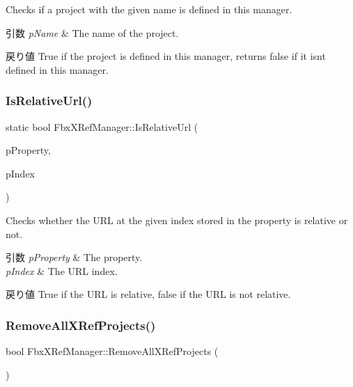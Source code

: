 Checks if a project with the given name is defined in this manager. 
\begin{DoxyParams}{引数}
{\em p\+Name} & The name of the project. \\
\hline
\end{DoxyParams}
\begin{DoxyReturn}{戻り値}
{\ttfamily True} if the project is defined in this manager, returns {\ttfamily false} if it isn\textquotesingle{}t defined in this manager. 
\end{DoxyReturn}
\mbox{\label{class_fbx_x_ref_manager_a27481156423d70e759c131954e3ea9a0}} 
\subsubsection{\texorpdfstring{Is\+Relative\+Url()}{IsRelativeUrl()}}
{\footnotesize\ttfamily static bool Fbx\+X\+Ref\+Manager\+::\+Is\+Relative\+Url (\begin{DoxyParamCaption}\item[{\hyperlink{class_fbx_property}{Fbx\+Property} const \&}]{p\+Property,  }\item[{int}]{p\+Index }\end{DoxyParamCaption})\hspace{0.3cm}{\ttfamily [static]}}

Checks whether the U\+RL at the given index stored in the property is relative or not. 
\begin{DoxyParams}{引数}
{\em p\+Property} & The property. \\
\hline
{\em p\+Index} & The U\+RL index. \\
\hline
\end{DoxyParams}
\begin{DoxyReturn}{戻り値}
{\ttfamily True} if the U\+RL is relative, {\ttfamily false} if the U\+RL is not relative. 
\end{DoxyReturn}
\mbox{\label{class_fbx_x_ref_manager_ae590ccb6ae282bed68c60bf697cd2645}} 
\subsubsection{\texorpdfstring{Remove\+All\+X\+Ref\+Projects()}{RemoveAllXRefProjects()}}
{\footnotesize\ttfamily bool Fbx\+X\+Ref\+Manager\+::\+Remove\+All\+X\+Ref\+Projects (\begin{DoxyParamCaption}{ }\end{DoxyParamCaption})}

